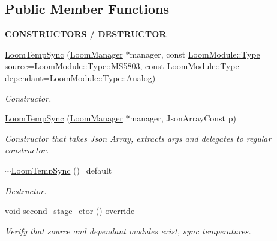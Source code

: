 \subsection*{Public Member Functions}
\begin{Indent}{\bf C\+O\+N\+S\+T\+R\+U\+C\+T\+O\+RS / D\+E\+S\+T\+R\+U\+C\+T\+OR}\par
\begin{DoxyCompactItemize}
\item 
\hyperlink{class_loom_temp_sync_a170a1ecdcdc8589f306f7ea40d4878ea}{Loom\+Temp\+Sync} (\hyperlink{class_loom_manager}{Loom\+Manager} $\ast$manager, const \hyperlink{class_loom_module_aee91d0a75140d51ee428fc2d4417d865}{Loom\+Module\+::\+Type} source=\hyperlink{class_loom_module_aee91d0a75140d51ee428fc2d4417d865abf2c722c90ddbbd2403395e349a31844}{Loom\+Module\+::\+Type\+::\+M\+S5803}, const \hyperlink{class_loom_module_aee91d0a75140d51ee428fc2d4417d865}{Loom\+Module\+::\+Type} dependant=\hyperlink{class_loom_module_aee91d0a75140d51ee428fc2d4417d865a3d953aa7cfa5ffe0fde34551d918c76c}{Loom\+Module\+::\+Type\+::\+Analog})
\begin{DoxyCompactList}\small\item\em Constructor. \end{DoxyCompactList}\item 
\hyperlink{class_loom_temp_sync_aae408072a7ead338db0f3d01b8579b42}{Loom\+Temp\+Sync} (\hyperlink{class_loom_manager}{Loom\+Manager} $\ast$manager, Json\+Array\+Const p)
\begin{DoxyCompactList}\small\item\em Constructor that takes Json Array, extracts args and delegates to regular constructor. \end{DoxyCompactList}\item 
\hyperlink{class_loom_temp_sync_a8e00454996d6a757235a975dccee2272}{$\sim$\+Loom\+Temp\+Sync} ()=default
\begin{DoxyCompactList}\small\item\em Destructor. \end{DoxyCompactList}\item 
void \hyperlink{class_loom_temp_sync_a0bc1a857bc87c30482c8175d69876b0a}{second\+\_\+stage\+\_\+ctor} () override
\begin{DoxyCompactList}\small\item\em Verify that source and dependant modules exist, sync temperatures. \end{DoxyCompactList}\end{DoxyCompactItemize}
\end{Indent}
